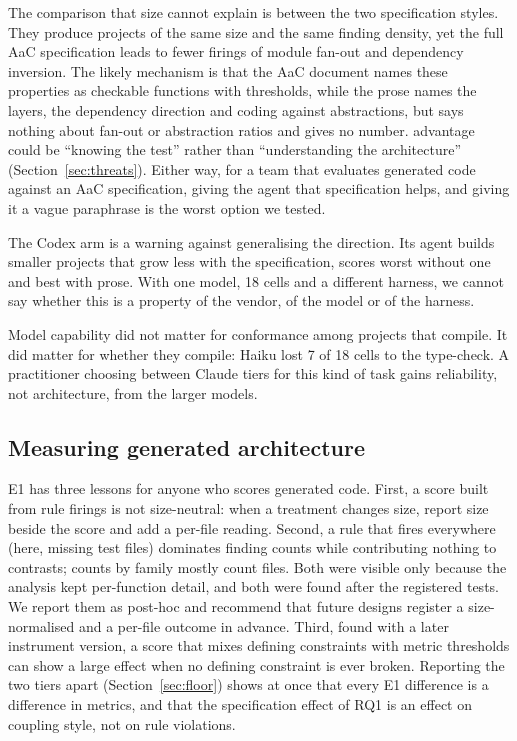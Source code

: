 \documentclass[10pt,a4paper]{article}
\newcommand{\lev}[1]{\texttt{\small #1}}
\begin{document}
The comparison that size cannot explain is between the two specification styles. They produce projects of the same
size and the same finding density, yet the full AaC specification leads to fewer firings of module fan-out and
dependency inversion. The likely mechanism is that the AaC document names these properties as checkable functions
with thresholds, while the prose names the layers, the dependency direction and coding against abstractions,
but says nothing about fan-out or abstraction ratios and gives no number. %
advantage could be ``knowing the test'' rather than ``understanding the architecture'' (Section~\ref{sec:threats}).
Either way, for a team that evaluates generated code against an AaC specification, giving the agent that
specification helps, and giving it a vague paraphrase is the worst option we tested.

The Codex arm is a warning against generalising the direction. Its agent builds smaller projects that grow less with
the specification, scores worst without one and best with prose. With one model, 18 cells and a different harness,
we cannot say whether this is a property of the vendor, of the model or of the harness.

Model capability did not matter for conformance among projects that compile. It did matter for whether they
compile: Haiku lost 7 of 18 cells to the type-check. A practitioner choosing between Claude tiers for this kind of
task gains reliability, not architecture, from the larger models.

\subsection{Measuring generated architecture}

E1 has three lessons for anyone who scores generated code. First, a score built from rule firings is not
size-neutral: when a treatment changes size, report size beside the score and add a per-file reading. Second, a
rule that fires everywhere (here, missing test files) dominates finding counts while contributing nothing to
contrasts; counts by family mostly count files. Both were visible only because the analysis kept per-function
detail, and both were found after the registered tests. We report them as post-hoc and recommend that future
designs register a size-normalised and a per-file outcome in advance. Third, found with a later instrument version, a score that mixes
defining constraints with metric thresholds can show a large effect when no defining constraint is ever broken.
Reporting the two tiers apart (Section~\ref{sec:floor}) shows at once that every E1 difference is a difference in
metrics, and that the specification effect of RQ1 is an effect on coupling style, not on rule violations.
\end{document}

